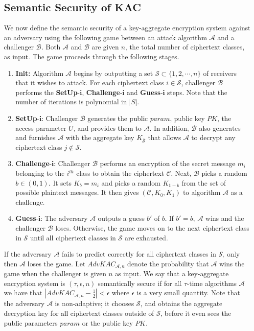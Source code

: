 \subsection{Semantic Security of KAC}
\label{subsec:semanticsecurity}

We now define the semantic security of a key-aggregate encryption system against an adversary using the following game between an attack algorithm $\mathcal{A}$ and a challenger $\mathcal{B}$. Both $\mathcal{A}$ and $\mathcal{B}$ are given $n$, the total number of ciphertext classes, as input. The game proceeds through the following stages.

\begin{enumerate}
 \item \textbf{Init:} Algorithm $\mathcal{A}$ begins by outputting a set $\mathcal{S} \subset \{1,2,\cdots,n\}$ of receivers that it wishes to attack. For each ciphertext class $i\in\mathcal{S}$, challenger $\mathcal{B}$ performs the \textbf{SetUp}-$\mathbf{i}$, \textbf{Challenge}-$\mathbf{i}$ and \textbf{Guess}-$\mathbf{i}$ steps. Note that the number of iterations is polynomial in $|S|$.

 \item \textbf{SetUp}-$\mathbf{i}$: Challenger $\mathcal{B}$ generates the public $param$, public key $PK$, the access parameter $U$, and provides them to $\mathcal{A}$. In addition, $\mathcal{B}$ also generates and furnishes $\mathcal{A}$ with the aggregate key $K_{\overline{\mathcal{S}}}$ that allows $\mathcal{A}$ to decrypt any ciphertext class $j\notin\mathcal{S}$. 
 \item \textbf{Challenge}-$\mathbf{i}$: Challenger $\mathcal{B}$ performs an encryption of the secret message $m_i$ belonging to the $i^{th}$ class to obtain the ciphertext $\mathcal{C}$. Next, $\mathcal{B}$ picks a random $b\in{(0,1)}$. It sets $K_b = m_i$ and picks a random $K_{1- b}$ from the set of possible plaintext messages. It then gives $(\mathcal{C}, K_0, K_1)$ to algorithm $\mathcal{A}$ as a challenge.
 
 \item\textbf{Guess}-$\mathbf{i}$: The adversary $\mathcal{A}$ outputs a guess $b'$ of $b$. If $b' = b$, $\mathcal{A}$ wins and the challenger $\mathcal{B}$ loses. Otherwise, the game moves on to the next ciphertext class in $\mathcal{S}$ until all ciphertext classes in $\mathcal{S}$ are exhausted.
\end{enumerate}
If the adversary $\mathcal{A}$ fails to predict correctly for all ciphertext classes in $\mathcal{S}$, only then $\mathcal{A}$ loses the game. Let $AdvKAC_{\mathcal{A},n}$ denote the probability that $\mathcal{A}$ wins the game when the challenger is given $n$ as input. We say that a key-aggregate encryption system is $(\tau,\epsilon,n)$ semantically secure if for all $\tau$-time algorithms $\mathcal{A}$ we have that $|AdvKAC_{\mathcal{A},n}-\frac{1}{2}| < \epsilon$ where $\epsilon$ is a very small quantity. Note that the adversary $\mathcal{A}$ is non-adaptive; it chooses $\mathcal{S}$, and obtains the aggregate decryption key for all ciphertext classes outside of $\mathcal{S}$, before it even sees the public parameters $param$ or the public key $PK$. 

